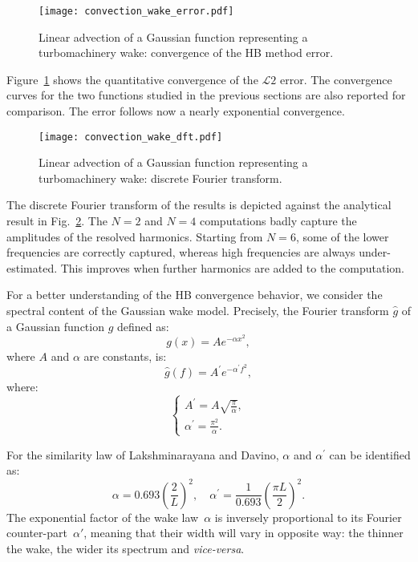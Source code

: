 \begin{figure}[htp]
  \centering
  \texttt{[image: convection\_wake\_error.pdf]}
  \caption{Linear advection of a Gaussian function representing a 
  turbomachinery wake: convergence of the HB method error.}
  \label{fig:conv_wake}
\end{figure}
Figure~\ref{fig:conv_wake} shows the quantitative convergence of 
the $\mathcal{L}2$ error. The
convergence curves for the two functions studied in the previous sections
are also reported for comparison.
The error follows now a nearly exponential convergence.
\begin{figure}[htp]
  \centering
  \texttt{[image: convection\_wake\_dft.pdf]}
  \caption{Linear advection of a Gaussian function representing a turbomachinery wake: 
  discrete Fourier transform.}
  \label{fig:dft_wake}
\end{figure}
The discrete Fourier transform of the results is
depicted against the analytical result in Fig.~\ref{fig:dft_wake}.
The $N=2$ and $N=4$ computations badly capture the amplitudes of the
resolved harmonics.
Starting from $N=6$, some of the lower 
frequencies are correctly captured, whereas high frequencies are
always under-estimated.
This improves when further harmonics are added to the computation.

For a better understanding of the HB convergence behavior, 
we consider the spectral content of the Gaussian wake model. 
Precisely, the Fourier transform $\widehat{g}$ of a Gaussian function $g$
defined as:
\begin{equation}
    g(x) = A e^{-\alpha x^2},
    \label{eq:simple_gaussian_function}
\end{equation}
where $A$ and $\alpha$ are constants, is:
\begin{equation}
    \widehat{g}(f) = A^\prime e^{-\alpha^\prime f^2},
    \label{eq:fourier_transform_gaussian}
\end{equation}
where:
\begin{equation}
  \begin{cases}
    A^\prime=A \sqrt{\frac{\pi}{\alpha}},\\
    \alpha^\prime = \frac{\pi^2}{\alpha}.
  \end{cases}
\end{equation}

For the similarity law of Lakshminarayana and Davino, 
$\alpha$ and $\alpha^\prime$ can be identified as:
\begin{equation}
    \alpha =  0.693 \left( \frac{2}{L} \right)^2, \quad
    \alpha^\prime =  \frac{1}{0.693} \left( \frac{\pi L}{2} \right)^2.
    \label{eq:gaussian_params_laksh}
\end{equation}
The exponential factor of the wake law~$\alpha$ is inversely
proportional to its Fourier counter-part~$\alpha'$, meaning that their
width will vary in opposite way: the thinner the wake, the wider its
spectrum and \emph{vice-versa}.

